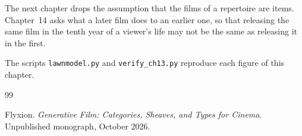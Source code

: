 \documentclass[11pt,twoside,openright]{book}
\theoremstyle{plain}
\theoremstyle{definition}
\theoremstyle{remark}
\begin{document}
The next chapter drops the assumption that the films of a repertoire are items. Chapter~14 asks what a later film does to an earlier one, so that releasing the same film in the tenth year of a viewer's life may not be the same as releasing it in the first.

The scripts \texttt{lawnmodel.py} and \texttt{verify\_ch13.py} reproduce each figure of this chapter.

\begin{thebibliography}{99}

Flyxion.
\newblock \emph{Generative Film: Categories, Sheaves, and Types for Cinema}.
\newblock Unpublished monograph, October 2026.

\end{thebibliography}
\end{document}
